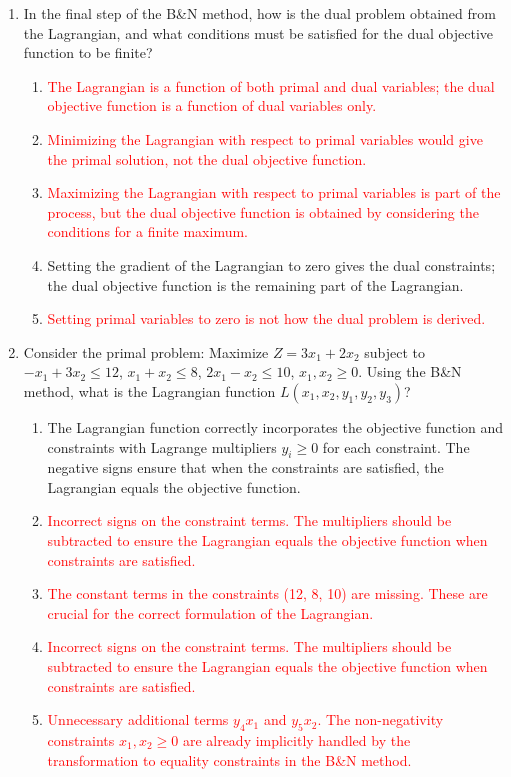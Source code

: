 \documentclass{article}%
\newcommand{\incorrect}[1]{\textcolor{red}{#1}}
\begin{document}
\begin{enumerate}
\begin{enumerate}
\item \incorrect{Weak duality is fundamental to the B&N method's derivation of the dual problem.}%
\end{enumerate}%
\vspace{1em}%
\item In the final step of the B&N method, how is the dual problem obtained from the Lagrangian, and what conditions must be satisfied for the dual objective function to be finite?%
\begin{enumerate}%
\item \incorrect{The Lagrangian is a function of both primal and dual variables; the dual objective function is a function of dual variables only.}%
\item \incorrect{Minimizing the Lagrangian with respect to primal variables would give the primal solution, not the dual objective function.}%
\item \incorrect{Maximizing the Lagrangian with respect to primal variables is part of the process, but the dual objective function is obtained by considering the conditions for a finite maximum.}%
\item Setting the gradient of the Lagrangian to zero gives the dual constraints; the dual objective function is the remaining part of the Lagrangian.%
\item \incorrect{Setting primal variables to zero is not how the dual problem is derived.}%
\end{enumerate}%
\vspace{1em}%
\item Consider the primal problem: Maximize $Z = 3x_1 + 2x_2$ subject to $-x_1 + 3x_2 \le 12$, $x_1 + x_2 \le 8$, $2x_1 - x_2 \le 10$, $x_1, x_2 \ge 0$. Using the B\&N method, what is the Lagrangian function $L(x_1, x_2, y_1, y_2, y_3)$?%
\begin{enumerate}%
\item The Lagrangian function correctly incorporates the objective function and constraints with Lagrange multipliers $y_i \ge 0$ for each constraint.  The negative signs ensure that when the constraints are satisfied, the Lagrangian equals the objective function.%
\item \incorrect{Incorrect signs on the constraint terms. The multipliers should be subtracted to ensure the Lagrangian equals the objective function when constraints are satisfied.}%
\item \incorrect{The constant terms in the constraints (12, 8, 10) are missing. These are crucial for the correct formulation of the Lagrangian.}%
\item \incorrect{Incorrect signs on the constraint terms. The multipliers should be subtracted to ensure the Lagrangian equals the objective function when constraints are satisfied.}%
\item \incorrect{Unnecessary additional terms $y_4x_1$ and $y_5x_2$. The non-negativity constraints $x_1, x_2 \ge 0$ are already implicitly handled by the transformation to equality constraints in the B\&N method.}%
\end{enumerate}%
\vspace{1em}%
\end{enumerate}

%
\end{document}
